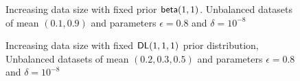 \documentclass[sigconf, anonymous]{acmart}
\begin{document}
\begin{figure}[H]
\begin{center}
\centering
\caption{Increasing data size with fixed prior $\mathsf{beta}(1,1)$. Unbalanced datasets of mean $(0.1,0.9)$ and parameters $\epsilon = 0.8$ and $\delta = 10^{-8}$}
\label{fig_vs_datasize}
\end{center}
\end{figure}

\begin{figure}[ht]
\begin{center}
\centering
\caption{Increasing data size with fixed $\mathsf{DL}(1,1,1)$ prior distribution, Unbalanced datasets of mean $(0.2,0.3, 0.5)$ and parameters $\epsilon = 0.8$ and $\delta = 10^{-8}$}
\label{fig_vs_datasize_dir}
\end{center}
\end{figure}
\end{document}
